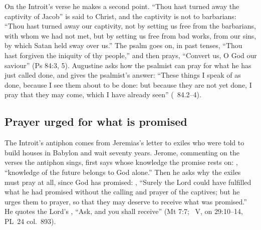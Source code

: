 On the Introit's verse he makes a second point. ``Thou hast turned away the
captivity of Jacob'' is said to Christ, and the captivity is not to
barbarians: ``Thou hast turned away our captivity, not by setting us free from
the barbarians, with whom we had not met, but by setting us free from bad
works, from our sins, by which Satan held sway over us.'' The psalm goes on,
in past tenses, ``Thou hast forgiven the iniquity of thy people,'' and then
prays, ``Convert us, O God our saviour'' (Ps 84:3, 5). Augustine asks how
the psalmist can pray for what he has just called done, and gives the
psalmist's answer: ``These things I speak of as done, because I see them about
to be done: but because they are not yet done, I pray that they may come,
which I have already seen'' (~84.2--4).

\subsection{Prayer urged for what is promised}
\label{sec:awaited-jerome}

The Introit's antiphon comes from Jeremias's letter to exiles who were told
to build houses in Babylon and wait seventy years. Jerome, commenting on the
verses the antiphon sings, first says whose knowledge the promise rests on:
, ``knowledge of the future
belongs to God alone.'' Then he asks why the exiles must pray at all, since
God has promised: , ``Surely the Lord could have fulfilled
what he had promised without the calling and prayer of the captives; but he
urges them to prayer, so that they may deserve to receive what was promised.''
He quotes the Lord's , ``Ask, and you shall
receive'' (Mt 7:7; ~V, on 29:10--14, PL~24 col.~893).

